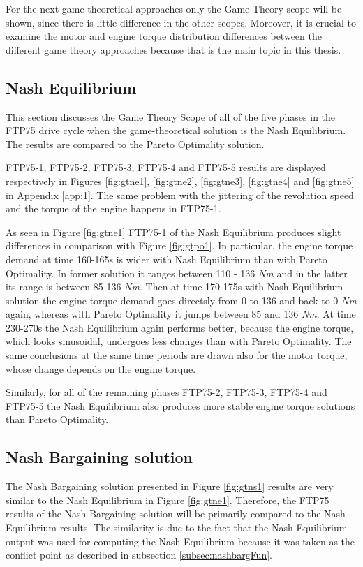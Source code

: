 For the next game-theoretical approaches only the Game Theory scope will be shown, since there is little difference in the other scopes. Moreover, it is crucial to examine the motor and engine torque distribution differences between the different game theory approaches because that is the main topic in this thesis.

\subsection{Nash Equilibrium}
This section discusses the Game Theory Scope of all of the five phases in the FTP75 drive cycle when the game-theoretical solution is the Nash Equilibrium. The results are compared to the Pareto Optimality solution.

FTP75-1, FTP75-2, FTP75-3, FTP75-4 and FTP75-5 results are displayed respectively in Figures \ref{fig:gtne1}, \ref{fig:gtne2}, \ref{fig:gtne3}, \ref{fig:gtne4} and \ref{fig:gtne5} in Appendix \ref{app:1}. The same problem with the jittering of the revolution speed and the torque of the engine happens in FTP75-1.

As seen in Figure \ref{fig:gtne1} FTP75-1 of the Nash Equilibrium produces slight differences in comparison with Figure \ref{fig:gtpo1}. In particular, the engine torque demand at time 160-165s is wider with Nash Equilibrium than with Pareto Optimality. In former solution it ranges between 110 - 136 \textit{Nm} and in the latter its range is between 85-136 \textit{Nm}. Then at time 170-175s with Nash Equilibrium solution the engine torque demand goes directsly from 0 to 136 and back to 0 \textit{Nm} again, whereas with Pareto Optimality it jumps between 85 and 136 \textit{Nm}. At time 230-270s the Nash Equilibrium again performs better, because the engine torque, which looks sinusoidal, undergoes less changes than with Pareto Optimality. The same conclusions at the same time periods are drawn also for the motor torque, whose change depends on the engine torque.

Similarly, for all of the remaining phases FTP75-2, FTP75-3, FTP75-4 and FTP75-5 the Nash Equilibrium also produces more stable engine torque solutions than Pareto Optimality.

\subsection{Nash Bargaining solution}
The Nash Bargaining solution presented in Figure \ref{fig:gtns1} results are very similar to the Nash Equilibrium in Figure \ref{fig:gtne1}. Therefore, the FTP75 results of the Nash Bargaining solution will be primarily compared to the Nash Equilibrium results. The similarity is due to the fact that the Nash Equilibrium output was used for computing the Nash Equilibrium because it was taken as the conflict point as described in subsection \ref{subsec:nashbargFun}.

